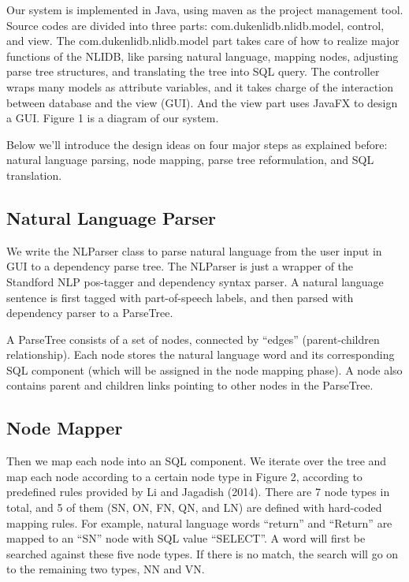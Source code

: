 \documentclass[twocolumn]{article}
\begin{document}
Our system is implemented in Java, using maven as the project management tool. Source codes are divided into three parts: com.dukenlidb.nlidb.model, control, and view. The com.dukenlidb.nlidb.model part takes care of how to realize major functions of the NLIDB, like parsing natural language, mapping nodes, adjusting parse tree structures, and translating the tree into SQL query. The controller wraps many models as attribute variables, and it takes charge of the interaction between database and the view (GUI). And the view part uses JavaFX to design a GUI. Figure 1 is a diagram of our system.

Below we’ll introduce the design ideas on four major steps as explained before: natural language parsing, node mapping, parse tree reformulation, and SQL translation.

\subsection{Natural Language Parser}
We write the NLParser class to parse natural language from the user input in GUI to a dependency parse tree. The NLParser is just a wrapper of the Standford NLP pos-tagger and dependency syntax parser. A natural language sentence is first tagged with part-of-speech labels, and then parsed with dependency parser to a ParseTree.

A ParseTree consists of a set of nodes, connected by ``edges'' (parent-children relationship). Each node stores the natural language word and its corresponding SQL component (which will be assigned in the node mapping phase). A node also contains parent and children links pointing to other nodes in the ParseTree.

\subsection{Node Mapper}
Then we map each node into an SQL component. We iterate over the tree and map each node according to a certain node type in Figure 2, according to predefined rules provided by Li and Jagadish (2014)\cite{li2014}. There are 7 node types in total, and 5 of them (SN, ON, FN, QN, and LN) are defined with hard-coded mapping rules. For example, natural language words “return” and “Return” are mapped to an “SN” node with SQL value “SELECT”. A word will first be searched against these five node types. If there is no match, the search will go on to the remaining two types, NN and VN.
\end{document}
